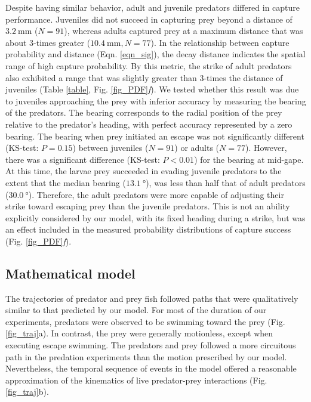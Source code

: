 \documentclass[]{rsos}%
\begin{document}
Despite having similar behavior, adult and juvenile predators differed in capture performance.
Juveniles did not succeed in capturing prey beyond a distance of $\SI{3.2}{\mm}$ ($N = 91$), whereas adults captured prey at a maximum distance that was about 3-times greater ($\SI{10.4}{\mm}, N = 77$).
In the relationship between capture probability and distance (Eqn. \ref{eqn_sig}), the decay distance indicates the spatial range of high capture probability. 
By this metric, the strike of adult predators also exhibited a range that was slightly greater than 3-times the distance of juveniles (Table \ref{table}, Fig. \ref{fig_PDF}\textit{f}).
We tested whether this result was due to juveniles approaching the prey with inferior accuracy by measuring the bearing of the predators.
The bearing corresponds to the radial position of the prey relative to the predator's heading, with perfect accuracy represented by a zero bearing.
The bearing when prey initiated an escape was not significantly different (KS-test: $P = 0.15$) between juveniles ($N = 91$) or adults ($N = 77$).
However, there was a significant difference (KS-test: $P < 0.01$) for the bearing at mid-gape.
At this time, the larvae prey succeeded in evading juvenile predators to the extent that the median bearing ($\SI{13.1}{\degree}$), was less than half that of adult predators ($\SI{30.0}{\degree}$).
Therefore, the adult predators were more capable of adjusting their strike toward escaping prey than the juvenile predators. 
This is not an ability explicitly considered by our model, with its fixed heading during a strike, but was an effect included in the measured probability distributions of capture success (Fig. \ref{fig_PDF}\textit{f}).

\subsection{Mathematical model} %
The trajectories of predator and prey fish followed paths that were qualitatively similar to that predicted by our model.
For most of the duration of our experiments, predators were observed to be swimming toward the prey (Fig. \ref{fig_traj}a). 
In contrast, the prey were generally motionless, except  when executing escape swimming.
The predators and prey followed a more circuitous path in the predation experiments than the motion prescribed by our model.
Nevertheless, the temporal sequence of events in the model offered a reasonable approximation of the kinematics of live predator-prey interactions (Fig. \ref{fig_traj}b).
\end{document}
